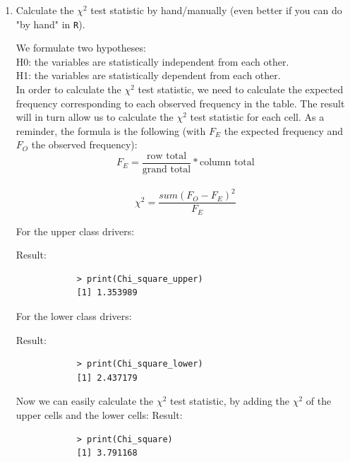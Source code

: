 \documentclass[12pt,letterpaper]{article}
\begin{document}
	\begin{enumerate}
		
		\item [(a)]
		Calculate the $\chi^2$ test statistic by hand/manually (even better if you can do "by hand" in \texttt{R}).\\
		\vspace{.5cm}
		
		We formulate two hypotheses: \\
		H0: the variables are statistically independent from each other.\\
		H1: the variables are statistically dependent from each other.\\
		
		In order to calculate the $\chi^2$ test statistic, we need to calculate the expected frequency corresponding to each observed frequency in the table. The result will in turn allow us to calculate the $\chi^2$ test statistic for each cell. As a reminder, the formula is the following (with $F_E$ the expected frequency and $F_O$ the observed frequency):
		\[
		F_E = \frac{\text{row total}}{\text{grand total}} * {\text{column total}}
		\]
		 \\
		\[ \chi^2 = \frac{sum(F_O - F_E)^2}{F_E}
		\]
		
		
		For the upper class drivers:
		
		  
		
		
		Result:
		  
		
		\begin{verbatim}
			> print(Chi_square_upper)
			[1] 1.353989
		\end{verbatim}
		
		\vspace{.2cm}
		
		For the lower class drivers:
		
		  
		Result:
		  
		\begin{verbatim}
			> print(Chi_square_lower)
			[1] 2.437179
		\end{verbatim}
		
		Now we can easily calculate the $\chi^2$ test statistic, by adding the $\chi^2$ of the upper cells and the lower cells:
		Result:
		  
		\begin{verbatim}
			> print(Chi_square)
			[1] 3.791168
		\end{verbatim}
		

\end{enumerate}
\end{document}
